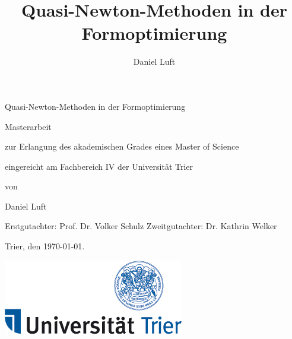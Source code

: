 \documentclass[bibliography=totoc,12pt,a4paper]{scrartcl}
\theoremstyle{exampstyle}
\numberwithin{equation}{section}
\begin{document}
\title{Quasi-Newton-Methoden in der Formoptimierung}

\author{Daniel Luft}

  \pagestyle{empty}

  \begin{titlepage}

    \vspace*{2cm} 

 \begin{center} \large 
    
    \vspace*{2cm}

    {\huge Quasi-Newton-Methoden in der Formoptimierung}
    \vspace*{2.5cm}
	
  \end{center}
  
	Masterarbeit
	\newline

	zur Erlangung des akademischen Grades eines \newline
	Master of Science
	\newline
	
	eingereicht am Fachbereich IV \newline
	der Universität Trier	
	\newline
	
	von	
	\newline
	
    Daniel Luft
    \newline
    
	Erstgutachter:  Prof. Dr. Volker Schulz \newline
	Zweitgutachter: Dr. Kathrin Welker 
	\newline
	
	Trier, den \today.

	
	
	\hspace{10cm}\vspace{-2cm}\includegraphics[scale=0.4]{Logo-Uni-Trier.jpg}

\end{titlepage}
\newpage
\end{document}
